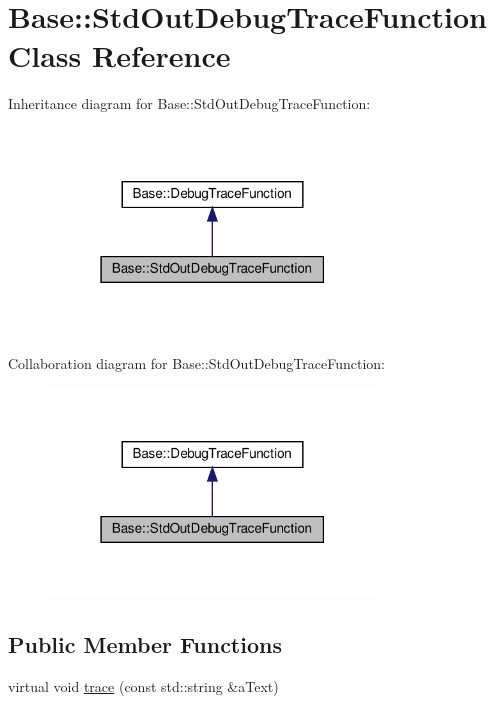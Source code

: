 \hypertarget{class_base_1_1_std_out_debug_trace_function}{}\section{Base\+:\+:Std\+Out\+Debug\+Trace\+Function Class Reference}
\label{class_base_1_1_std_out_debug_trace_function}


Inheritance diagram for Base\+:\+:Std\+Out\+Debug\+Trace\+Function\+:
\nopagebreak
\begin{figure}[H]
\begin{center}
\leavevmode
\includegraphics[width=247pt]{class_base_1_1_std_out_debug_trace_function__inherit__graph}
\end{center}
\end{figure}


Collaboration diagram for Base\+:\+:Std\+Out\+Debug\+Trace\+Function\+:
\nopagebreak
\begin{figure}[H]
\begin{center}
\leavevmode
\includegraphics[width=247pt]{class_base_1_1_std_out_debug_trace_function__coll__graph}
\end{center}
\end{figure}
\subsection*{Public Member Functions}
\begin{DoxyCompactItemize}
\item 
virtual void \hyperlink{class_base_1_1_std_out_debug_trace_function_a28cdac2a99589f238350d78743b920be}{trace} (const std\+::string \&a\+Text)
\end{DoxyCompactItemize}


